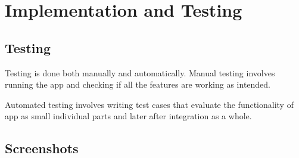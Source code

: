 \documentclass[../Report.tex]{subfiles}
\begin{document}
\chapter{Implementation and Testing}

\section{Testing}

Testing is done both manually and automatically. Manual testing involves running the app and checking if all the features are working as 
intended.\par
Automated testing involves writing test cases that evaluate the functionality of app as small individual parts and later after integration 
as a whole.

\section{Screenshots}
\end{document}
